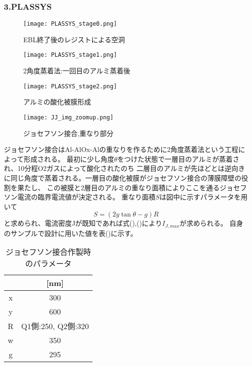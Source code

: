 \subsubsection{3.PLASSYS}
\begin{figure}[H]
    \begin{center}
        \texttt{[image: PLASSYS\_stage0.png]}
        \caption{EBL終了後のレジストによる空洞}
    \end{center}
\end{figure}
\begin{figure}[H]
    \begin{center}
        \texttt{[image: PLASSYS\_stage1.png]}
        \caption{2角度蒸着法:一回目のアルミ蒸着後}
    \end{center}
\end{figure}
\begin{figure}[H]
    \begin{center}
        \texttt{[image: PLASSYS\_stage2.png]}
        \caption{アルミの酸化被膜形成}
    \end{center}
\end{figure}
\begin{figure}[H]
    \begin{center}
        \texttt{[image: JJ\_img\_zoomup.png]}
        \caption{ジョセフソン接合,重なり部分}
    \end{center}
\end{figure}
ジョセフソン接合はAl-AlOx-Alの重なりを作るために2角度蒸着法という工程によって形成される。
最初に少し角度$\theta$をつけた状態で一層目のアルミが蒸着され、10分程O2ガスによって酸化されたのち
二層目のアルミが先ほどとは逆向きに同じ角度で蒸着される。一層目の酸化被膜がジョセフソン接合の薄膜障壁の役割を果たし、
この被膜と2層目のアルミの重なり面積によりここを通るジョセフソン電流の臨界電流値が決定される。
重なり面積$S$は図中に示すパラメータを用いて
\begin{equation}
    S = (2y \tan \theta -g)R
\end{equation}
と求められ、電流密度Jが既知であれば式(),()により$I_{J,max}$が求められる。
自身のサンプルで設計に用いた値を表()に示す。
\begin{table}[H]
    \caption{ジョセフソン接合作製時のパラメータ}
    \begin{center}
    \begin{tabular}{|c|c|}
    \hline
     & [nm]\\
    \hline
    \hline
    x & 300\\
    \hline
    y & 600\\
    \hline
    R & Q1側:250, Q2側:320\\
    \hline
    w & 350 \\
    \hline
    g & 295 \\
    \hline
    \end{tabular}
\end{center}
\end{table}
